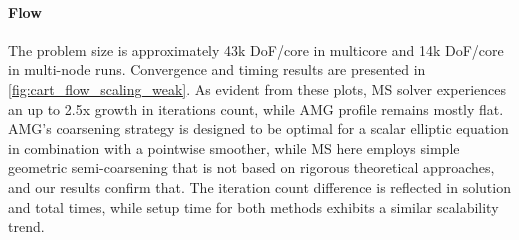 \paragraph{Flow}
The problem size is approximately 43k DoF/core in multicore and 14k DoF/core in multi-node runs.   Convergence and timing results are presented in \cref{fig:cart_flow_scaling_weak}.   As evident from these plots, MS solver experiences an up to 2.5x growth in iterations count, while AMG profile remains mostly flat.   AMG's coarsening strategy is designed to be optimal for a scalar elliptic equation in combination with a pointwise smoother, while MS here employs simple geometric semi-coarsening that is not based on rigorous theoretical approaches, and our results confirm that.   The iteration count difference is reflected in solution and total times, while setup time for both methods exhibits a similar scalability trend.

